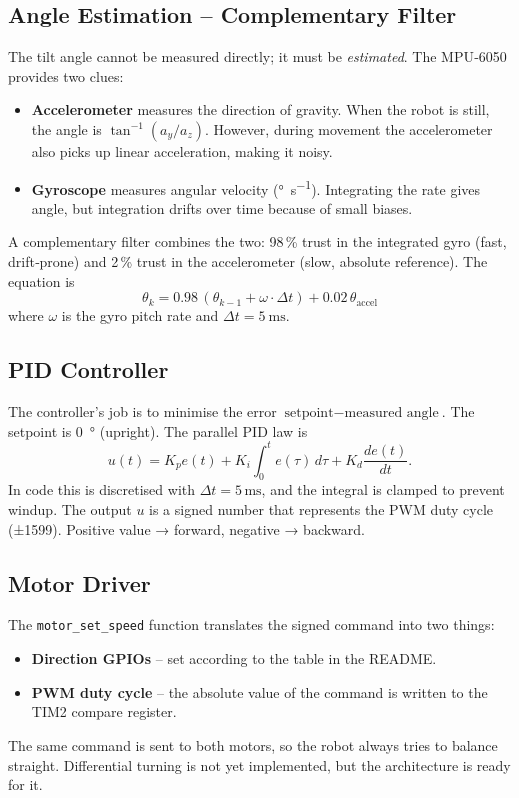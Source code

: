 \documentclass[12pt,a4paper]{article}
\newcommand{\func}[1]{\texttt{#1}}
\begin{document}
	\subsection{Angle Estimation -- Complementary Filter}
	The tilt angle cannot be measured directly; it must be \textit{estimated}. The MPU‑6050 provides two clues:
	\begin{itemize}
		\item \textbf{Accelerometer} measures the direction of gravity. When the robot is still, the angle is \(\tan^{-1}(a_y / a_z)\). However, during movement the accelerometer also picks up linear acceleration, making it noisy.
		\item \textbf{Gyroscope} measures angular velocity (\si{\degree\per\second}). Integrating the rate gives angle, but integration drifts over time because of small biases.
	\end{itemize}
	A complementary filter combines the two: 98\,\% trust in the integrated gyro (fast, drift‑prone) and 2\,\% trust in the accelerometer (slow, absolute reference). The equation is
	\[
	\theta_k = 0.98\,(\theta_{k-1} + \omega \cdot \Delta t) + 0.02\,\theta_{\text{accel}}
	\]
	where \(\omega\) is the gyro pitch rate and \(\Delta t = \SI{5}{\milli\second}\).
	
	\subsection{PID Controller}
	The controller’s job is to minimise the error \(\text{setpoint} - \text{measured angle}\). The setpoint is \SI{0}{\degree} (upright).  
	The parallel PID law is
	\[
	u(t) = K_p e(t) + K_i \int_0^t e(\tau)\,d\tau + K_d \frac{de(t)}{dt}.
	\]
	In code this is discretised with \(\Delta t = 5\,\text{ms}\), and the integral is clamped to prevent windup.  
	The output \(u\) is a signed number that represents the PWM duty cycle (±1599). Positive value → forward, negative → backward.
	
	\subsection{Motor Driver}
	The \func{motor\_set\_speed} function translates the signed command into two things:
	\begin{itemize}
		\item \textbf{Direction GPIOs} -- set according to the table in the README.
		\item \textbf{PWM duty cycle} -- the absolute value of the command is written to the TIM2 compare register.
	\end{itemize}
	The same command is sent to both motors, so the robot always tries to balance straight. Differential turning is not yet implemented, but the architecture is ready for it.
	
\end{document}

